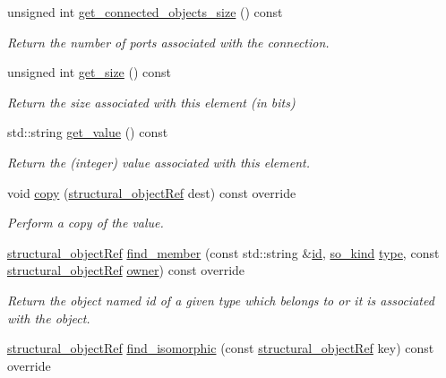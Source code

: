 \begin{DoxyCompactItemize}
unsigned int \hyperlink{classconstant__o_a87c4947f107b7d197cd53ca7d5e2be2c}{get\+\_\+connected\+\_\+objects\+\_\+size} () const
\begin{DoxyCompactList}\small\item\em Return the number of ports associated with the connection. \end{DoxyCompactList}\item 
unsigned int \hyperlink{classconstant__o_a98f744693152c30b90c614306edaa732}{get\+\_\+size} () const
\begin{DoxyCompactList}\small\item\em Return the size associated with this element (in bits) \end{DoxyCompactList}\item 
std\+::string \hyperlink{classconstant__o_afd5134cbc13e0d2bf8583322d90478ac}{get\+\_\+value} () const
\begin{DoxyCompactList}\small\item\em Return the (integer) value associated with this element. \end{DoxyCompactList}\item 
void \hyperlink{classconstant__o_a658c0b11683baa33746bb8ed5e0f238c}{copy} (\hyperlink{structural__objects_8hpp_a8ea5f8cc50ab8f4c31e2751074ff60b2}{structural\+\_\+object\+Ref} dest) const override
\begin{DoxyCompactList}\small\item\em Perform a copy of the value. \end{DoxyCompactList}\item 
\hyperlink{structural__objects_8hpp_a8ea5f8cc50ab8f4c31e2751074ff60b2}{structural\+\_\+object\+Ref} \hyperlink{classconstant__o_af186549f255ee02a5c14a8c14043ba94}{find\+\_\+member} (const std\+::string \&\hyperlink{classstructural__object_a841a75f6e349ff7c1987dc92d4ac33a6}{id}, \hyperlink{structural__objects_8hpp_acf52399aecacb7952e414c5746ce6439}{so\+\_\+kind} \hyperlink{classstructural__object_a9a7159ce4c8da9984f256d9032f49778}{type}, const \hyperlink{structural__objects_8hpp_a8ea5f8cc50ab8f4c31e2751074ff60b2}{structural\+\_\+object\+Ref} \hyperlink{classstructural__object_a3e96b3e00b8a78adfc44872d82e186ea}{owner}) const override
\begin{DoxyCompactList}\small\item\em Return the object named id of a given type which belongs to or it is associated with the object. \end{DoxyCompactList}\item 
\hyperlink{structural__objects_8hpp_a8ea5f8cc50ab8f4c31e2751074ff60b2}{structural\+\_\+object\+Ref} \hyperlink{classconstant__o_aa4bf7187d16113ee8a90b2758e03f6b5}{find\+\_\+isomorphic} (const \hyperlink{structural__objects_8hpp_a8ea5f8cc50ab8f4c31e2751074ff60b2}{structural\+\_\+object\+Ref} key) const override

\end{DoxyCompactItemize}

